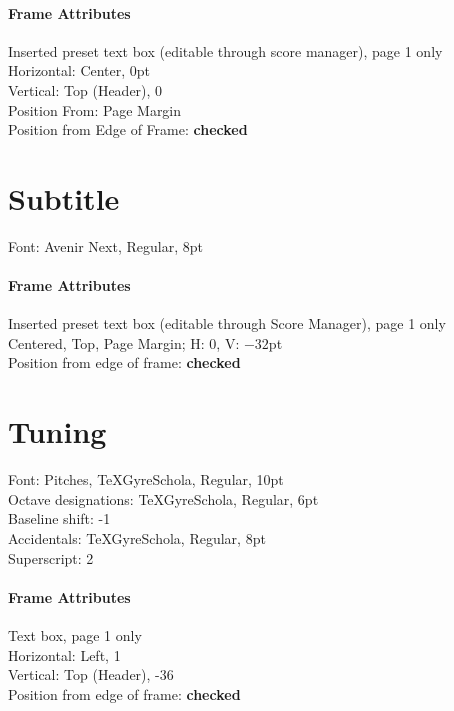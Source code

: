 \documentclass[]{memoir}
\begin{document}
\paragraph{Frame Attributes}
Inserted preset text box (editable through score manager), page 1 only\\
Horizontal: Center, 0pt\\
Vertical: Top (Header), 0\\
Position From: Page Margin\\
Position from Edge of Frame: \textbf{checked}

\section{Subtitle}
\label{sec:subtitle}

Font: Avenir Next, Regular, 8pt

\paragraph{Frame Attributes}
\label{sec:frame-attributes}

Inserted preset text box (editable through Score Manager), page 1 only\\
Centered, Top, Page Margin; H: 0, V: $-32$pt\\
Position from edge of frame: \textbf{checked}

\section{Tuning}
\label{sec:tuning}

Font: Pitches, TeXGyreSchola, Regular, 10pt\\
\indent Octave designations: TeXGyreSchola, Regular, 6pt\\
\indent Baseline shift: -1\\
Accidentals: TeXGyreSchola, Regular, 8pt\\
\indent Superscript: 2

\paragraph{Frame Attributes}
\label{sec:frame-attributes-1}

Text box, page 1 only\\
Horizontal: Left, 1\\
Vertical: Top (Header), -36\\
Position from edge of frame: \textbf{checked}
\end{document}
